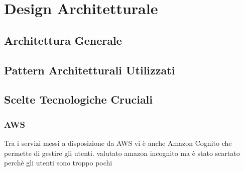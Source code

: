 \chapter{Design Architetturale}
    \section{Architettura Generale}
    \section{Pattern Architetturali Utilizzati}
    \section{Scelte Tecnologiche Cruciali}
        \subsection{AWS}
        Tra i servizi messi a disposizione da AWS vi è anche Amazon Cognito che permette di gestire gli utenti. 
        valutato amazon incognito ma è stato scartato perchè gli utenti sono troppo pochi
